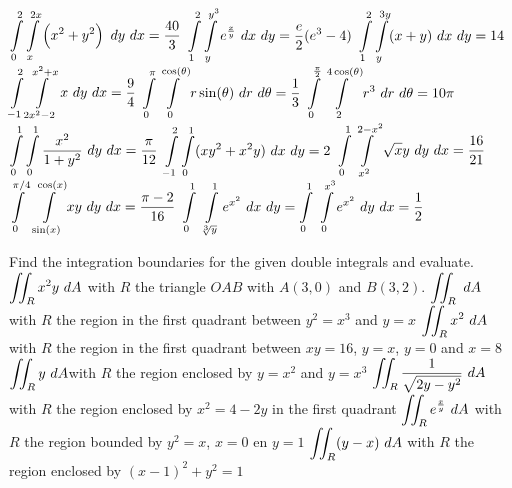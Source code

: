 \begin{Answer}
    \begin{multicols}{2}
    
            \Question $\displaystyle \int\limits_0^2\int\limits_{x}^{2x} \left(x^2+y^2\right)\ dy\ dx = \dfrac{40}{3}$
            \Question $\displaystyle \int\limits_1^2\int\limits_{y}^{y^3} e^{\frac{x}{y}}\ dx\ dy = \dfrac{e}{2} (e^3-4)$
            \Question $\ds \int\limits_1^2\int\limits_{y}^{3y} (x+y)\ dx\ dy = 14$
            \Question $\displaystyle \int\limits_{-1}^2\int\limits_{2x^2-2}^{x^2+x} x\ dy\ dx = \dfrac{9}{4}$
            \Question $\ds \int\limits_{0}^{\pi}\int\limits_{0}^{\cos(\theta)} r \sin(\theta)\ dr\ d\theta = \dfrac{1}{3}$
            \Question $\ds \int\limits_{0}^{\frac{\pi}{2}}\int\limits_{2}^{4\cos(\theta)} r^3\ dr\ d\theta = 10 \pi$
            \Question $\displaystyle \int\limits_{0}^1\int\limits_{0}^{1} \dfrac{x^2}{1+y^2}\ dy\ dx = \dfrac{\pi}{12}$
            \Question $\displaystyle \int\limits_{-1}^{2} \int\limits_0^1 (xy^2 + x^2y)\ dx\ dy = 2$ 
            \Question $\displaystyle \int\limits_0^1\int\limits_{x^2}^{2-x^2} \sqrt{x}y\ dy\ dx = \dfrac{16}{21} $ 
            \Question $\ds \int\limits_0^{\pi/4}\ \int\limits_{\sin(x)}^{\cos(x)} xy \ dy\ dx = \dfrac{\pi - 2}{16}$ 
            \Question $\ds \int\limits_0^{1}\ \int\limits_{\sqrt[3]{y}}^{1} e^{x^2} \ dx\ dy = \int\limits_0^{1}\ \int\limits_0^{x^3} e^{x^2} \ dy\ dx = \dfrac{1}{2}$
    \EndCurrentQuestion
    \end{multicols}
\end{Answer}


\begin{Exercise} Find the integration boundaries for the given double integrals and evaluate.
        \Question[difficulty = 1] $\displaystyle \iint_R x^2 y \ dA$ \quad with $R$ the triangle $OAB$ with $A(3,0)$ and $B(3,2)$. %
        \Question[difficulty = 3] $\displaystyle \iint_R\ dA$ \quad  with $R$ the region in the first quadrant between $y^2=x^3$ and $y=x$
        \Question[difficulty = 3] $\displaystyle \iint_R x^2 \ dA$ \quad with $R$ the region in the first quadrant between $xy=16$, $y=x$, $y=0$ and $x=8$
        \Question[difficulty = 2] $\displaystyle \iint_R y\ dA$\quad  with $R$ the region enclosed by $y=x^2$ and $y=x^3$
        \Question[difficulty = 3] $\ds \iint_R \dfrac{1}{\sqrt{2y-y^2}} \ dA$ \quad with $R$ the region enclosed by $x^2=4-2y$ in the first quadrant
        \Question[difficulty = 2] $\displaystyle \iint_R e^{\frac{x}{y}} \ dA$ \quad  with $R$ the region bounded by $y^2=x$, $x=0$ en $y=1$ 
        \Question[difficulty = 3] $\displaystyle \iint_R (y-x) \ dA$ \quad with $R$ the region enclosed by $(x-1)^2+y^2=1$
\end{Exercise}

